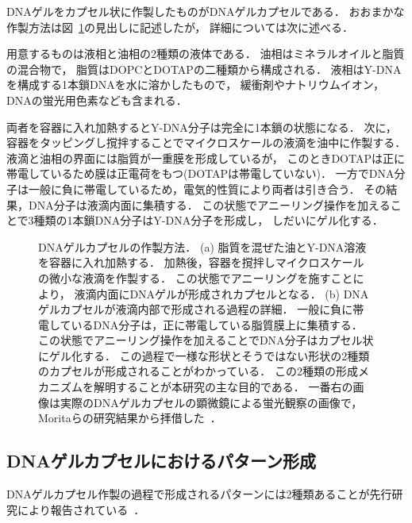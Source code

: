 DNAゲルをカプセル状に作製したものがDNAゲルカプセルである．
おおまかな作製方法は図~\ref{fig:capsule}の見出しに記述したが，
詳細については次に述べる．

用意するものは液相と油相の2種類の液体である．
油相はミネラルオイルと脂質の混合物で，
脂質はDOPCとDOTAPの二種類から構成される．
液相はY-DNAを構成する1本鎖DNAを水に溶かしたもので，
緩衝剤やナトリウムイオン，DNAの蛍光用色素なども含まれる．

両者を容器に入れ加熱するとY-DNA分子は完全に1本鎖の状態になる．
次に，容器をタッピングし撹拌することでマイクロスケールの液滴を油中に作製する．
液滴と油相の界面には脂質が一重膜を形成しているが，
このときDOTAPは正に帯電しているため膜は正電荷をもつ(DOTAPは帯電していない)．
一方でDNA分子は一般に負に帯電しているため，電気的性質により両者は引き合う．
その結果，DNA分子は液滴内面に集積する．
この状態でアニーリング操作を加えることで3種類の1本鎖DNA分子はY-DNA分子を形成し，
しだいにゲル化する．

\begin{figure}
\centering

\caption{DNAゲルカプセルの作製方法．
    (a) 脂質を混ぜた油とY-DNA溶液を容器に入れ加熱する．
        加熱後，容器を撹拌しマイクロスケールの微小な液滴を作製する．
        この状態でアニーリングを施すことにより，
        液滴内面にDNAゲルが形成されカプセルとなる．
    (b) DNAゲルカプセルが液滴内部で形成される過程の詳細．
        一般に負に帯電しているDNA分子は，正に帯電している脂質膜上に集積する．
        この状態でアニーリング操作を加えることでDNA分子はカプセル状にゲル化する．
        この過程で一様な形状とそうではない形状の2種類のカプセルが形成されることがわかっている．
        この2種類の形成メカニズムを解明することが本研究の主な目的である．
        一番右の画像は実際のDNAゲルカプセルの顕微鏡による蛍光観察の画像で，
        Moritaらの研究結果から拝借した~\cite{morita2017formation}．
}

\label{fig:capsule}
\end{figure}


\subsection{DNAゲルカプセルにおけるパターン形成}

DNAゲルカプセル作製の過程で形成されるパターンには2種類あることが先行研究により報告されている~\cite{morita2017formation}．

